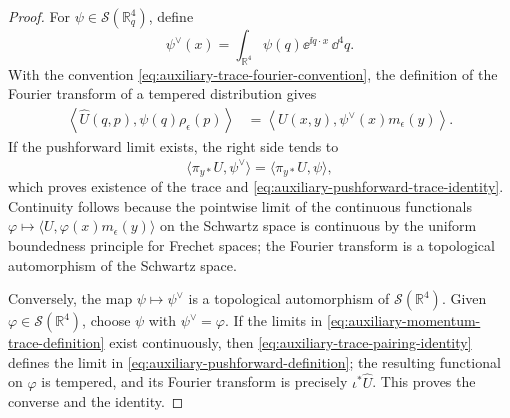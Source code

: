 \begin{proof}
For \(\psi\in\mathcal S(\mathbb R_q^4)\), define
\begin{equation}
  \psi^\vee(x)=\int_{\mathbb R^4}\psi(q)\ee^{\ii q\cdot x}\,\dd^4q .
  \label{eq:auxiliary-trace-test-inverse}
\end{equation}
With the convention
\eqref{eq:auxiliary-trace-fourier-convention}, the definition of the
Fourier transform of a tempered distribution gives
\begin{equation}
\begin{aligned}
  \left\langle
    \widehat U(q,p),
    \psi(q)\rho_\epsilon(p)
  \right\rangle
  &=
  \left\langle
    U(x,y),
    \psi^\vee(x)m_\epsilon(y)
  \right\rangle .
\end{aligned}
  \label{eq:auxiliary-trace-pairing-identity}
\end{equation}
If the pushforward limit exists, the right side tends to
\[
  \langle\pi_{y*}U,\psi^\vee\rangle
  =
  \langle\widehat{\pi_{y*}U},\psi\rangle,
\]
which proves existence of the trace and
\eqref{eq:auxiliary-pushforward-trace-identity}.  Continuity follows because
the pointwise limit of the continuous functionals
\(\varphi\mapsto\langle U,\varphi(x)m_\epsilon(y)\rangle\) on the
Schwartz space is continuous by the uniform boundedness principle for
Frechet spaces; the Fourier transform is a topological automorphism of the
Schwartz space.

Conversely, the map
\(\psi\mapsto\psi^\vee\) is a topological automorphism of
\(\mathcal S(\mathbb R^4)\).  Given
\(\varphi\in\mathcal S(\mathbb R^4)\), choose
\(\psi\) with \(\psi^\vee=\varphi\).  If the limits in
\eqref{eq:auxiliary-momentum-trace-definition} exist continuously, then
\eqref{eq:auxiliary-trace-pairing-identity} defines the limit in
\eqref{eq:auxiliary-pushforward-definition}; the resulting functional on
\(\varphi\) is tempered, and its Fourier transform is precisely
\(\iota^*\widehat U\).  This proves the converse and the identity.
\end{proof}

